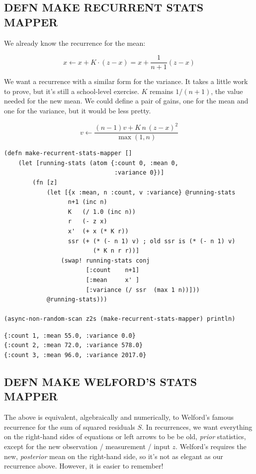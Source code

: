 \documentclass[10pt,oneside,x11names]{article}
\begin{document}
\subsection{DEFN MAKE RECURRENT STATS MAPPER}
\label{recurrent-variance}
We already know the recurrence for the mean:

$$x\leftarrow{x+K\cdot(z-x)=x+\frac{1}{n+1}(z-x)}$$

We want a recurrence with a similar form for the variance. It takes a
little work to prove, but it's still a school-level exercise. \(K\)
remains \(1/(n+1)\), the value needed for the new mean. We could define a
pair of gains, one for the mean and one for the variance, but it would
be less pretty.

$$v\leftarrow\frac{\left(n-1\right)v+K\,n\,\left(z-x\right)^2}{\max(1,n)}$$

\begin{verbatim}
(defn make-recurrent-stats-mapper []
    (let [running-stats (atom {:count 0, :mean 0,
                               :variance 0})]
        (fn [z]
            (let [{x :mean, n :count, v :variance} @running-stats
                  n+1 (inc n)
                  K   (/ 1.0 (inc n))
                  r   (- z x)
                  x'  (+ x (* K r))
                  ssr (+ (* (- n 1) v) ; old ssr is (* (- n 1) v)
                         (* K n r r))]
                (swap! running-stats conj
                       [:count    n+1]
                       [:mean     x' ]
                       [:variance (/ ssr  (max 1 n))]))
            @running-stats)))

(async-non-random-scan z2s (make-recurrent-stats-mapper) println)
\end{verbatim}

\begin{verbatim}
{:count 1, :mean 55.0, :variance 0.0}
{:count 2, :mean 72.0, :variance 578.0}
{:count 3, :mean 96.0, :variance 2017.0}
\end{verbatim}

\subsection{DEFN MAKE WELFORD'S STATS MAPPER}
\label{welfords-variance}
The above is equivalent, algebraically and numerically, to Welford's
famous recurrence for the sum of squared residuals \(S\). In recurrences,
we want everything on the right-hand sides of equations or left arrows
to be be old, \emph{prior} statistics, except for the new observation /
measurement / input \(z\). Welford's requires the new, \emph{posterior} mean on
the right-hand side, so it's not as elegant as our recurrence above.
However, it is easier to remember!
\end{document}
